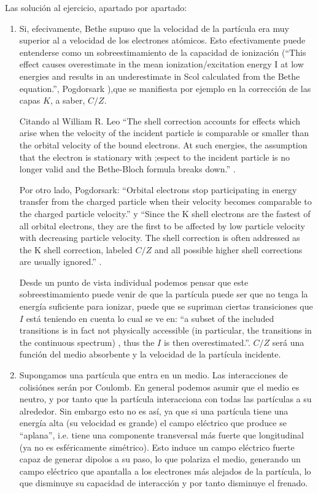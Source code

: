 Las solución al ejercicio, apartado por apartado: 
\begin{enumerate}[label=\alph*)]
    \item Si, efecivamente, Bethe supuso que la velocidad de la partícula era muy superior al a velocidad de los electrones atómicos. Esto efectivamente puede entenderse como un sobreestimamiento de la capacidad de ionización (``This effect causes  overestimate in the mean ionization/excitation energy I at low energies and results in an underestimate in Scol calculated from the Bethe equation.'', Pogdorsark \cite{Podgorsak2022}),que se manifiesta por ejemplo en la corrección de las capas $K$, a saber, $C/Z$.
    
    Citando al William R. Leo ``The shell correction accounts for effects which arise when the velocity of the incident particle is comparable or smaller than the orbital velocity of the bound electrons. At such energies, the assumption that the electron is stationary with ;espect to the incident particle is no longer valid and the Bethe-Bloch formula breaks down.'' \cite{Leo1994}.

    Por otro lado, Pogdorsark: ``Orbital electrons stop participating in energy transfer from the charged particle when their  velocity becomes comparable to the charged particle velocity.'' y ``Since the K shell electrons are the fastest of all orbital electrons, they are the first to be affected by low particle velocity with decreasing particle velocity. The shell correction is often addressed as the K shell correction, labeled $C/Z$ and all possible higher shell corrections are usually ignored.'' \cite{Podgorsak2022}.

    Desde un punto de vista individual podemos pensar que este sobreestimamiento puede venir de que la partícula puede ser que no tenga la energía suficiente para ionizar, puede que se supriman ciertas transiciones que $I$ está teniendo en cuenta lo cual se ve en: ``a subset of the included transitions is in fact not physically accessible (in particular, the transitions in the continuous spectrum) , thus the $I$ is then overestimated.''.  $C/Z$ será una función del medio absorbente y la velocidad de la partícula incidente. 

    \item Supongamos una partícula que entra en un medio. Las interacciones de colisiónes serán por Coulomb. En general podemos asumir que el medio es neutro, y por tanto que la partícula interacciona con todas las partículas a su alrededor. Sin embargo esto no es así, ya que si una partícula tiene una energía alta (su velocidad es grande) el campo eléctrico que produce se ``aplana'', i.e. tiene una componente transversal más fuerte que longitudinal (ya no es esféricamente simétrico). Esto induce un campo eléctrico fuerte capaz de generar dipolos a su paso, lo que polariza el medio, generando un campo eléctrico que apantalla a los electrones más alejados de la partícula, lo que disminuye su capacidad de interacción y por tanto disminuye el frenado. 
    

\end{enumerate}

